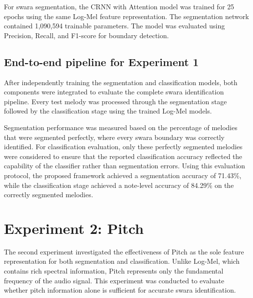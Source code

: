 
For swara segmentation, the CRNN with Attention model was trained for 25 epochs using the same Log-Mel feature representation. The segmentation network contained 1,090,594 trainable parameters. The model was evaluated using Precision, Recall, and F1-score for boundary detection.


\subsection*{End-to-end pipeline for Experiment 1}

After independently training the segmentation and classification models, both components were integrated to evaluate the complete swara identification pipeline. Every test melody was processed through the segmentation stage followed by the classification stage using the trained Log-Mel models.

Segmentation performance was measured based on the percentage of melodies that were segmented perfectly, where every swara boundary was correctly identified. For classification evaluation, only these perfectly segmented melodies were considered to ensure that the reported classification accuracy reflected the capability of the classifier rather than segmentation errors. Using this evaluation protocol, the proposed framework achieved a segmentation accuracy of 71.43\%, while the classification stage achieved a note-level accuracy of 84.29\% on the correctly segmented melodies.


\section{Experiment 2: Pitch}

The second experiment investigated the effectiveness of Pitch as the sole feature representation for both segmentation and classification. Unlike Log-Mel, which contains rich spectral information, Pitch represents only the fundamental frequency of the audio signal. This experiment was conducted to evaluate whether pitch information alone is sufficient for accurate swara identification.

